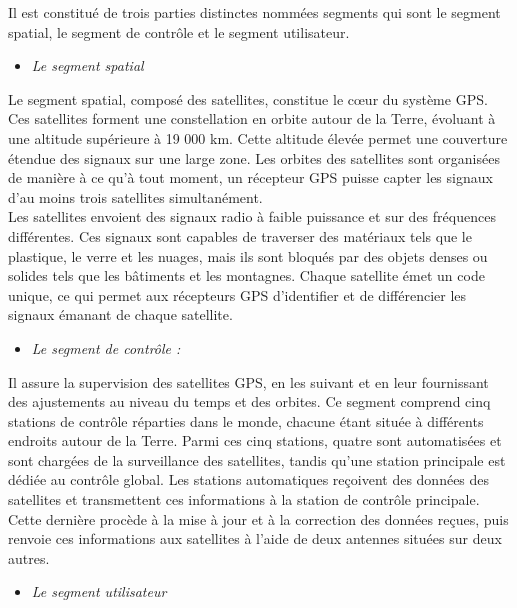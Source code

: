 Il est constitué de trois parties distinctes nommées segments qui sont le segment spatial, le segment de contrôle et le segment utilisateur.

\begin{itemize}[label=-]
\item \textit{Le segment spatial}
\end{itemize}


Le segment spatial, composé des satellites, constitue le cœur du système GPS. Ces satellites forment une constellation en orbite autour de la Terre, évoluant à une altitude supérieure à 19 000 km. Cette altitude élevée permet une couverture étendue des signaux sur une large zone. Les orbites des satellites sont organisées de manière à ce qu'à tout moment, un récepteur GPS puisse capter les signaux d'au moins trois satellites simultanément.\\

Les satellites envoient des signaux radio à faible puissance et sur des fréquences différentes. Ces signaux sont capables de traverser des matériaux tels que le plastique, le verre et les nuages, mais ils sont bloqués par des objets denses ou solides tels que les bâtiments et les montagnes. Chaque satellite émet un code unique, ce qui permet aux récepteurs GPS d'identifier et de différencier les signaux émanant de chaque satellite.

\begin{itemize}[label=-]
\item \textit{Le segment de contrôle : }
\end{itemize}

Il assure la supervision des satellites GPS, en les suivant et en leur fournissant des ajustements au niveau du temps et des orbites. Ce segment comprend cinq stations de contrôle réparties dans le monde, chacune étant située à différents endroits autour de la Terre. Parmi ces cinq stations, quatre sont automatisées et sont chargées de la surveillance des satellites, tandis qu'une station principale est dédiée au contrôle global. Les stations automatiques reçoivent des données des satellites et transmettent ces informations à la station de contrôle principale. Cette dernière procède à la mise à jour et à la correction des données reçues, puis renvoie ces informations aux satellites à l'aide de deux antennes situées sur deux autres.

\begin{itemize}[label=-]
	\item \textit{Le segment utilisateur}
\end{itemize}


